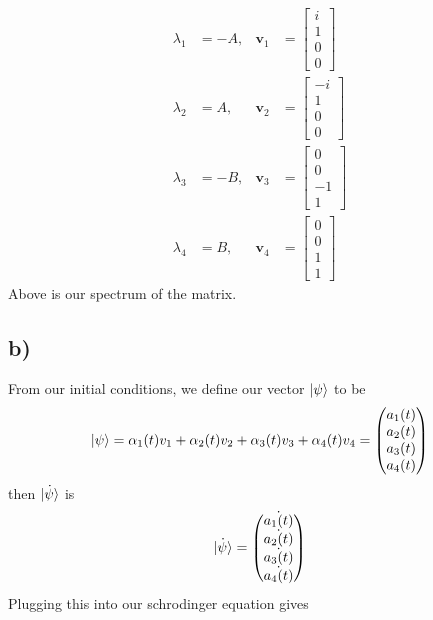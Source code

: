 \documentclass[]{article}
\begin{document}
\[
\begin{align}
\lambda_1 &= -A, & \mathbf{v}_1 &= \begin{bmatrix} i \\ 1 \\ 0 \\ 0 \end{bmatrix} \\[10pt]
\lambda_2 &= A, & \mathbf{v}_2 &= \begin{bmatrix} -i \\ 1 \\ 0 \\ 0 \end{bmatrix} \\[10pt]
\lambda_3 &= -B, & \mathbf{v}_3 &= \begin{bmatrix} 0 \\ 0 \\ -1 \\ 1 \end{bmatrix} \\[10pt]
\lambda_4 &= B, & \mathbf{v}_4 &= \begin{bmatrix} 0 \\ 0 \\ 1 \\ 1 \end{bmatrix}
\end{align}
\] Above is our spectrum of the matrix.

\hypertarget{b-2}{%
\subsection{b)}\label{b-2}}

From our initial conditions, we define our vector \(\ket{\psi}\) to be
\[
\ket{\psi}  = \alpha_{1}(t)v_{1}+\alpha_{2}(t)v_{2}+\alpha_{3}(t)v_{3}+\alpha_{4}(t)v_{4} = \begin{pmatrix}
a_{1}(t) \\
a_{2}(t) \\ 
a_{3}(t) \\ 
a_{4}(t) \\
\end{pmatrix}
\] then \(\dot{\ket{\psi}}\) is \[
 \dot{\ket{\psi}}=
\begin{pmatrix}
\dot{a_{1}(t)} \\
\dot{a_{2}(t) }\\ 
\dot{a_{3}(t) }\\ 
\dot{a_{4}(t)} \\
\end{pmatrix}
\] Plugging this into our schrodinger equation gives
\end{document}
